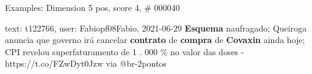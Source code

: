 \begin{frame}{Examples: Dimension 5 pos, score 4, \# 000040}
\footnotesize
\begin{exampleblock}{text: t122766, user: Fabiopf08Fabio, 2021-06-29}
\textbf{Esquema} naufragado; Queiroga anuncia que governo irá cancelar 
\textbf{contrato} de \textbf{compra} de \textbf{Covaxin} ainda hoje; CPI 
revelou superfaturamento de 1 . 000 \% no valor das doses - 
https://t.co/FZwDyt0Jzw via @br-2pontos 
\end{exampleblock}
\end{frame}
